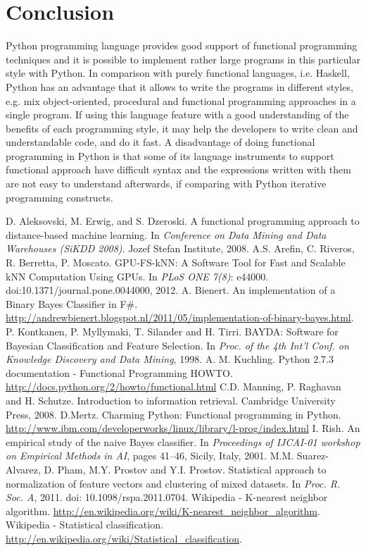 \documentclass{llncs}
\begin{document}
\section{Conclusion}

Python programming language provides good support of functional programming techniques and it is possible to implement rather large programs in this particular style with Python. In comparison with purely functional languages, i.e. Haskell, Python has an advantage that it allows to write the programs in different styles, e.g. mix object-oriented, procedural and functional programming approaches in a single program. If using this language feature with a good understanding of the benefits of each programming style, it may help the developers to write clean and understandable code, and do it fast. A disadvantage of doing functional programming in Python is that some of its language instruments to support functional approach have difficult syntax and the expressions written with them are not easy to understand afterwards, if comparing with Python iterative programming constructs.

\begin{thebibliography}{99}
 D. Aleksovski, M. Erwig, and S. Dzeroski. A functional programming approach to distance-based machine learning. In \emph{Conference on Data Mining and Data Warehouses (SiKDD 2008)}. Jozef Stefan Institute, 2008.
 A.S. Arefin, C. Riveros, R. Berretta, P. Moscato. GPU-FS-kNN: A Software Tool for Fast and Scalable kNN Computation Using GPUs. In \emph{PLoS ONE 7(8)}: e44000. doi:10.1371/journal.pone.0044000, 2012.
 A. Bienert. An implementation of a Binary Bayes Classifier in F\#. \url{http://andrewbienert.blogspot.nl/2011/05/implementation-of-binary-bayes.html}.
P. Kontkanen, P. Myllymaki, T. Silander and H. Tirri. BAYDA: Software for Bayesian Classification and Feature Selection. In \emph{Proc. of the 4th
Int'l Conf. on Knowledge Discovery and Data Mining}, 1998.
 A. M. Kuchling. Python 2.7.3 documentation - Functional Programming HOWTO. \url{http://docs.python.org/2/howto/functional.html}
 C.D. Manning, P. Raghavan and H. Schutze. Introduction to information retrieval.  Cambridge University Press, 2008. 
 D.Mertz. Charming Python: Functional programming in Python. \url{http://www.ibm.com/developerworks/linux/library/l-prog/index.html}
 I. Rish. An empirical study of the naive Bayes classifier. In \emph{Proceedings of IJCAI-01 workshop on Empirical Methods in AI}, pages 41--46, Sicily, Italy, 2001.
 M.M. Suarez-Alvarez, D. Pham, M.Y. Prostov and Y.I. Prostov. Statistical approach to normalization of feature vectors and clustering of mixed datasets. In \emph{Proc. R. Soc. A}, 2011. doi: 10.1098/rspa.2011.0704. 
 Wikipedia - K-nearest neighbor algorithm. \url{http://en.wikipedia.org/wiki/K-nearest\_neighbor\_algorithm}.
 Wikipedia - Statistical classification. \url{http://en.wikipedia.org/wiki/Statistical\_classification}. 
\end{thebibliography}
\end{document}
